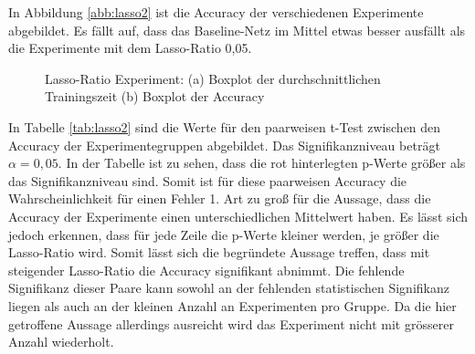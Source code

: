 In Abbildung \ref{abb:lasso2} ist die Accuracy der verschiedenen Experimente abgebildet. Es fällt auf, dass das Baseline-Netz im Mittel etwas besser ausfällt als die Experimente mit dem Lasso-Ratio 0,05.
\begin{figure}
     \centering
     \hfill
     \caption{Lasso-Ratio Experiment: (a) Boxplot der durchschnittlichen Trainingszeit (b) Boxplot der Accuracy}
     \label{abb:lasso}
\end{figure}
In Tabelle \ref{tab:lasso2} sind die Werte für den paarweisen t-Test zwischen den Accuracy der Experimentegruppen abgebildet. Das Signifikanzniveau beträgt $\alpha =0,05$. In der Tabelle ist zu sehen, dass die rot hinterlegten p-Werte größer als das Signifikanzniveau sind. Somit ist für diese paarweisen Accuracy die Wahrscheinlichkeit für einen Fehler 1. Art zu groß für die Aussage, dass die Accuracy der Experimente einen unterschiedlichen Mittelwert haben. Es lässt sich jedoch erkennen, dass für jede Zeile die p-Werte kleiner werden, je größer die Lasso-Ratio wird. Somit lässt sich die begründete Aussage treffen, dass mit steigender Lasso-Ratio die Accuracy signifikant abnimmt.
Die fehlende Signifikanz dieser Paare kann sowohl an der fehlenden statistischen Signifikanz liegen als auch an der kleinen Anzahl an Experimenten pro Gruppe. Da die hier getroffene Aussage allerdings ausreicht wird das Experiment nicht mit grösserer Anzahl wiederholt.




